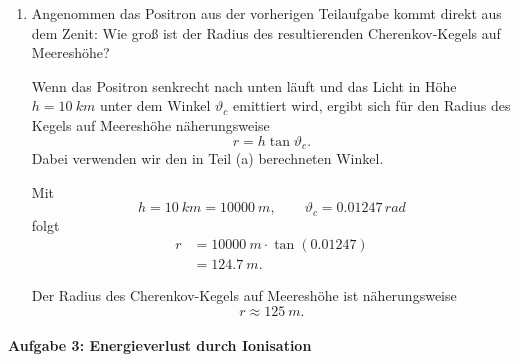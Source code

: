 \documentclass[11pt,a4paper]{scrartcl}
\begin{document}
\begin{enumerate}[label=(\alph*)]
            \begin{answerbox}
                Der Cherenkov-Winkel beträgt
                \[
                    \boxed{\vartheta_c=0.01247\,\si{rad}=\SI{0.714}{\degree}.}
                \]
            \end{answerbox}

        \item
            Angenommen das Positron aus der vorherigen Teilaufgabe kommt direkt aus dem Zenit:
            Wie groß ist der Radius des resultierenden Cherenkov-Kegels auf Meereshöhe?

            \begin{calculationbox}
                Wenn das Positron senkrecht nach unten läuft und das Licht in Höhe
                $h=\SI{10}{km}$ unter dem Winkel $\vartheta_c$ emittiert wird, ergibt sich
                für den Radius des Kegels auf Meereshöhe näherungsweise
                \[
                    r=h\tan\vartheta_c.
                \]
                Dabei verwenden wir den in Teil (a) berechneten Winkel.

                \begin{calculationbox}
                    Mit
                    \[
                        h=\SI{10}{km}=\SI{10000}{m},
                        \qquad
                        \vartheta_c=0.01247\,\si{rad}
                    \]
                    folgt
                    \begin{align*}
                        r&=\SI{10000}{m}\cdot \tan(0.01247)\\
                        &=\SI{124.7}{m}.
                    \end{align*}
                \end{calculationbox}
            \end{calculationbox}

            \begin{answerbox}
                Der Radius des Cherenkov-Kegels auf Meereshöhe ist näherungsweise
                \[
                    \boxed{r\approx\SI{125}{m}.}
                \]
            \end{answerbox}
    \end{enumerate}

    \newpage
    \paragraph{Aufgabe 3: Energieverlust durch Ionisation}
\end{document}
